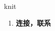 
\begin{frame}
{\huge knit}
\begin{center}
\begin{enumerate}\Large
  \item \textbf{连接，联系}
\end{enumerate}
\end{center}
\end{frame}
